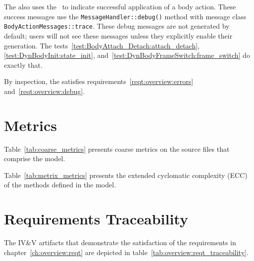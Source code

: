 The \ModelDesc also uses the \MESSAGE~to indicate successful
application of a body action. These success messages use the
\verb+MessageHandler::debug()+ method with message class
\verb+BodyActionMessages::trace+.
These debug messages are not generated by default; users will not see these
messages unless they explicitly enable their generation.
The tests~\ref{test:BodyAttach_Detach:attach_detach},
\ref{test:DynBodyInit:state_init},
and~\ref{test:DynBodyFrameSwitch:frame_switch} do exactly that.

By inspection, the \ModelDesc satisfies
requirements~\ref{reqt:overview:errors}
and~\ref{reqt:overview:debug}.


\section{Metrics}

Table~\ref{tab:coarse_metrics} presents coarse metrics on the source
files that comprise the model.



Table~\ref{tab:metrix_metrics} presents the extended cyclomatic complexity
(ECC) of the methods defined in the model.




\section{Requirements Traceability}

The IV\&V artifacts that demonstrate the satisfaction of the requirements
in chapter~\ref{ch:overview:reqt} are depicted in
table~\ref{tab:overview:reqt_traceability}.

